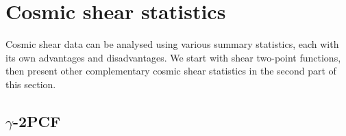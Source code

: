 \section{Cosmic shear statistics}
\label{sec:theory}

Cosmic shear data can be analysed using various summary statistics, each with its own advantages and disadvantages.
We start with shear two-point functions, then present other complementary cosmic shear statistics in the second part of this section.

\subsection{$\gamma$-2PCF}
\label{subsec:wl-th}



